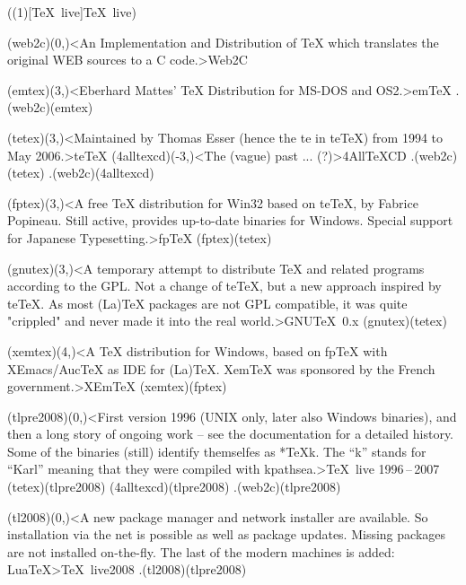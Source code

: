\tograph(\tostruct(1)[\TeX\ live]{\TeX\ live}){
	\tonode(web2c)(0,\layer)<An Implementation and Distribution of TeX which translates the original WEB sources to a C code.>{Web2C}
	\steplayer

	\tonode[\histdistro](emtex)(3,\layer)<Eberhard Mattes' TeX Distribution for MS-DOS and OS2.>{em\TeX} %
	\todraw.(web2c)(emtex)
	\steplayer

	\tonode[\histdistro](tetex)(3,\layer)<Maintained by Thomas Esser (hence the te in teTeX) from 1994 to May 2006.>{te\TeX}
	\tonode[\histdistro](4alltexcd)(-3,\layer)<The (vague) past ... (?)>{4All\TeX CD }
	\todraw.(web2c)(tetex)
	\todraw.(web2c)(4alltexcd)
	\steplayer

	\tonode(fptex)(3,\layer)<A free TeX distribution for Win32 based on teTeX, by Fabrice Popineau. Still active, provides up-to-date binaries for Windows. Special support for Japanese Typesetting.>{fp\TeX}
	\todraw(fptex)(tetex)

	\tonode(gnutex)(3,\layer)<A temporary attempt to distribute TeX and related programs according to the GPL. Not a change of teTeX, but a new approach inspired by teTeX. As most (La)TeX packages are not GPL compatible, it was quite "crippled" and never made it into the real world.>{GNU\TeX\ 0.x}
	\todraw(gnutex)(tetex)

	\steplayer[-2.5]

	\tonode[\histdistro](xemtex)(4,\layer)<A TeX distribution for Windows, based on fpTeX with XEmacs/AucTeX as IDE for (La)TeX. XemTeX was sponsored by the French government.>{XEm\TeX}
	\todraw(xemtex)(fptex)

	\tonode[\histdistro](tlpre2008)(0,\layer)<First version 1996 (UNIX only, later also Windows binaries), and then a long story of ongoing work – see the documentation for a detailed history. Some of the binaries (still) identify themselfes as *TeXk. The “k” stands for “Karl” meaning that they were compiled with kpathsea.>{\TeX\ live 1996\,–\,2007}
	\todraw(tetex)(tlpre2008)
	\todraw(4alltexcd)(tlpre2008)
	\todraw.(web2c)(tlpre2008)
	\steplayer

	\tonode(tl2008)(0,\layer)<A new package manager and network installer are available. So installation via the net is possible as well as package updates. Missing packages are not installed on-the-fly. The last of the modern machines is added: LuaTeX>{\TeX\ live2008}
	\todraw.(tl2008)(tlpre2008)

}
